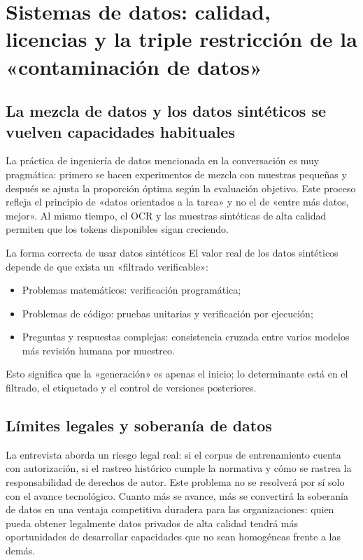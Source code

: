 \section{Sistemas de datos: calidad, licencias y la triple restricción de la «contaminación de datos»}

\subsection{La mezcla de datos y los datos sintéticos se vuelven capacidades habituales}

La práctica de ingeniería de datos mencionada en la conversación es muy pragmática: primero se hacen experimentos de mezcla con muestras pequeñas y después se ajusta la proporción óptima según la evaluación objetivo. Este proceso refleja el principio de «datos orientados a la tarea» y no el de «entre más datos, mejor». Al mismo tiempo, el OCR y las muestras sintéticas de alta calidad permiten que los tokens disponibles sigan creciendo.

\begin{importantbox}{La forma correcta de usar datos sintéticos}
El valor real de los datos sintéticos depende de que exista un «filtrado verificable»:
\begin{itemize}[leftmargin=1.5em]
    \item Problemas matemáticos: verificación programática;
    \item Problemas de código: pruebas unitarias y verificación por ejecución;
    \item Preguntas y respuestas complejas: consistencia cruzada entre varios modelos más revisión humana por muestreo.
\end{itemize}
Esto significa que la «generación» es apenas el inicio; lo determinante está en el filtrado, el etiquetado y el control de versiones posteriores.
\end{importantbox}

\subsection{Límites legales y soberanía de datos}

La entrevista aborda un riesgo legal real: si el corpus de entrenamiento cuenta con autorización, si el rastreo histórico cumple la normativa y cómo se rastrea la responsabilidad de derechos de autor. Este problema no se resolverá por sí solo con el avance tecnológico. Cuanto más se avance, más se convertirá la soberanía de datos en una ventaja competitiva duradera para las organizaciones: quien pueda obtener legalmente datos privados de alta calidad tendrá más oportunidades de desarrollar capacidades que no sean homogéneas frente a las demás.

